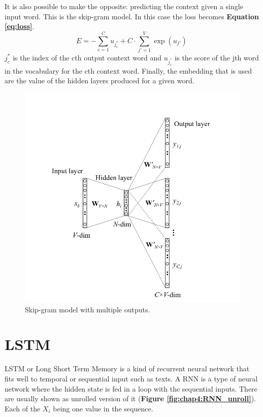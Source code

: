 It is also possible to make the opposite: predicting the context given a single input word. This is the skip-gram model. In this case the loss becomes \textbf{Equation \ref{eq:loss}}.
\begin{equation}
 E = - \sum_{c=1}^C u_{j^*_c} + C \cdot \sum_{j' = 1}^V \exp(u_{j'}) \ \label{eq:loss}
\end{equation}
$j_c^*$ is the index of the cth output context word and $u_{j^*_c}$ is the score of the jth word in the vocabulary for the cth context word. Finally, the embedding that is used are the value of the hidden layers produced for a given word. 
\begin{figure}
 \centering
 \includegraphics[width=\textwidth]{images/chapitre4/skip-gram}
 \caption{Skip-gram model with multiple outputs.}
 \label{fig:chap4:skip-gram}
\end{figure}
\section{LSTM}
LSTM or Long Short Term Memory\cite{Hochreiter1997LongSM} is a kind of recurrent neural network that fits well to temporal or sequential input such as texts. A RNN is a type of neural network where the hidden state is fed in a loop with the sequential inputs. There are usually shown as unrolled version of it (\textbf{Figure \ref{fig:chap4:RNN_unroll}}). Each of the $X_i$ being one value in the sequence.\\

